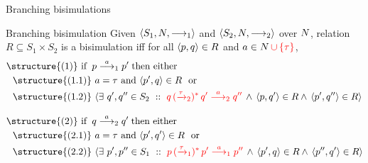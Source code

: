 \documentclass[aspectratio=169]{beamer}
\begin{document}
\begin{slide}{Branching bisimulations}
\small

\medskip
{}


\begin{block}{Branching bisimulation}
Given  $\mathopen{\langle}S_1, N,  \longrightarrow_1\mathclose{\rangle}$  and $\mathopen{\langle}S_2, N, \longrightarrow_2\mathclose{\rangle}$ over $N$,
relation $R \subseteq S_1 \times S_2$ is a \alert{bisimulation} iff for all $\mathopen{\langle}p,q\mathclose{\rangle} \in R$ and $a \in N\,\textcolor{red}{\cup\left\{ \tau \right\}}$,
%
\begin{align*}\small
&\text{\structure{(1)} if}\; \;   p \rtran{a}_1 p'\; \text{then either}
  \\&~~
  \text{\structure{(1.1)}~} a=\tau \text{~and~}\pair{p',q}\in R \text{~~or}
  \\&~~
  \text{\structure{(1.2)}~}
    \rcb{\exists}{q',q'' \in S_2}{}{\rdb{q \,(\trans{\tau}_2)^{*}\,q' \tran{a}_2  q''}\, \e\,
    \pair{p,q'} \in R \e\,
    \pair{p',q''} \in R} \\[3mm]
&\text{\structure{(2)} if}\; \;   q \rtran{a}_2 q'\; \text{then either}
  \\&~~
  \text{\structure{(2.1)}~} a=\tau \text{~and~}\pair{p',q'}\in R \text{~~or}
  \\&~~
  \text{\structure{(2.2)}~}
    \rcb{\exists}{p',p'' \in S_1}{}{\rdb{p \,(\trans{\tau}_1)^{*}\,p' \tran{a}_1  p''}\, \e\,
    \pair{p',q} \in R \e\,
    \pair{p'',q'} \in R}
\end{align*}
\end{block}
\end{slide}
\end{document}
